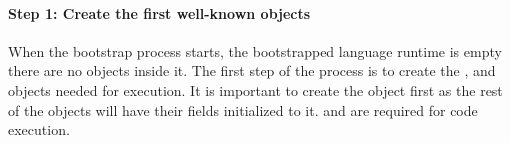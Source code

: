 \paragraph{\textbf{Step 1: Create the first well-known objects}}\label{sec:create_nil}

When the bootstrap process starts, the bootstrapped language runtime is empty \ie there are no objects inside it. 
The first step of the process is to create the ,  and  objects needed for execution. It is important to create the  object first as the rest of the objects will have their fields initialized to it.  and  are required for code execution.
%




